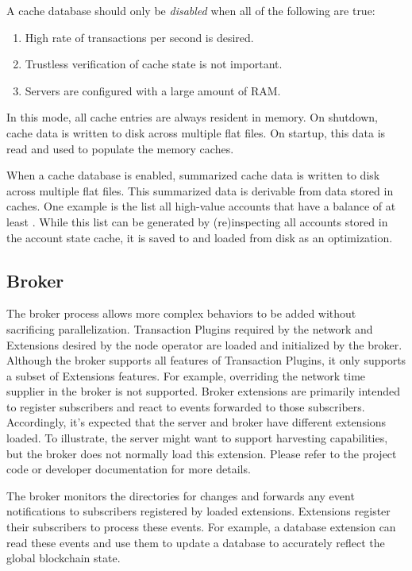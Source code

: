 A cache database should only be \emph{disabled} when all of the following are true:

\begin{enumerate}
	\item{High rate of transactions per second is desired.}
	\item{Trustless verification of cache state is not important.}
	\item{Servers are configured with a large amount of RAM.}
\end{enumerate}

In this mode, all cache entries are always resident in memory.
On shutdown, cache data is written to disk across multiple flat files.
On startup, this data is read and used to populate the memory caches.

When a cache database is enabled, summarized cache data is written to disk across multiple flat files.
This summarized data is derivable from data stored in caches.
One example is the list all high-value accounts that have a balance of at least .
While this list can be generated by (re)inspecting all accounts stored in the account state cache, it is saved to and loaded from disk as an optimization.

\subsection{Broker}

The broker process allows more complex \codenamespace behaviors to be added without sacrificing parallelization.
Transaction Plugins required by the network and \codenamespace Extensions desired by the node operator are loaded and initialized by the broker.
Although the broker supports all features of Transaction Plugins, it only supports a subset of \codenamespace Extensions features.
For example, overriding the network time supplier in the broker is not supported.
Broker extensions are primarily intended to register subscribers and react to events forwarded to those subscribers.
Accordingly, it's expected that the server and broker have different extensions loaded.
To illustrate, the server might want to support harvesting capabilities, but the broker does not normally load this extension.
Please refer to the project code or developer documentation for more details.

The broker monitors the  directories for changes and forwards any event notifications to subscribers registered by loaded extensions.
Extensions register their subscribers to process these events.
For example, a database extension can read these events and use them to update a database to accurately reflect the global blockchain state.

